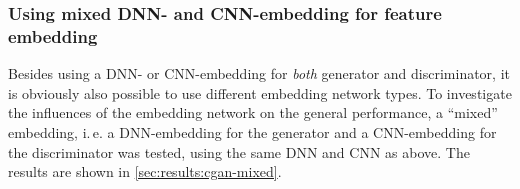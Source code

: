 \subsubsection{Using mixed DNN- and CNN-embedding for feature embedding}
Besides using a DNN- or CNN-embedding for \emph{both} generator and discriminator, it is obviously also possible
to use different embedding network types.
To investigate the influences of the embedding network on the general performance,
a ``mixed'' embedding, i.\,e. a DNN-embedding for the generator and a CNN-embedding for the discriminator was tested,
using the same DNN and CNN as above.
The results are shown in \cref{sec:results:cgan-mixed}.











